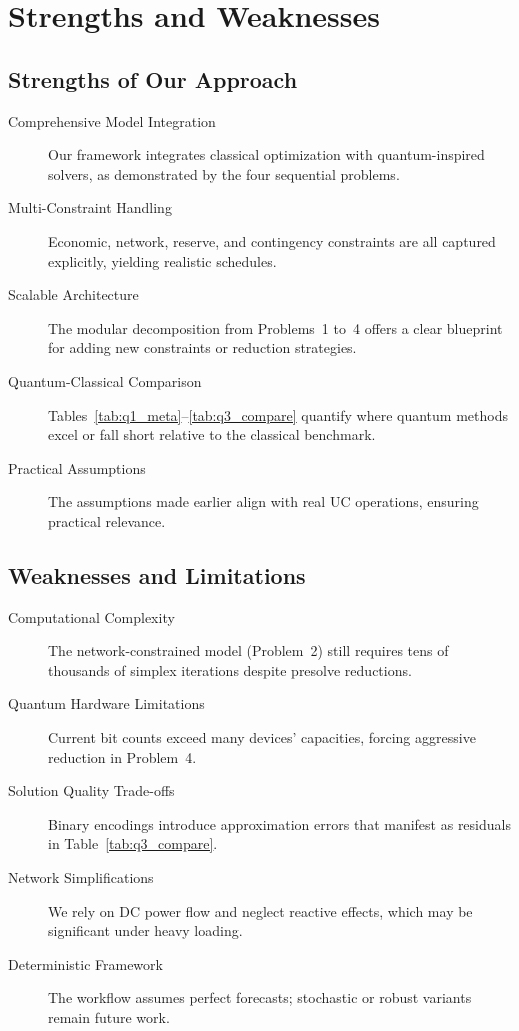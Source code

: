 \documentclass{apmcmthesis}
\begin{document}
\section{Strengths and Weaknesses}

\subsection{Strengths of Our Approach}

\begin{description}
\item[Comprehensive Model Integration] Our framework integrates classical optimization with quantum-inspired solvers, as demonstrated by the four sequential problems.

\item[Multi-Constraint Handling] Economic, network, reserve, and contingency constraints are all captured explicitly, yielding realistic schedules.

\item[Scalable Architecture] The modular decomposition from Problems~1 to~4 offers a clear blueprint for adding new constraints or reduction strategies.

\item[Quantum-Classical Comparison] Tables~\ref{tab:q1_meta}--\ref{tab:q3_compare} quantify where quantum methods excel or fall short relative to the classical benchmark.

\item[Practical Assumptions] The assumptions made earlier align with real UC operations, ensuring practical relevance.
\end{description}

\subsection{Weaknesses and Limitations}

\begin{description}
\item[Computational Complexity] The network-constrained model (Problem~2) still requires tens of thousands of simplex iterations despite presolve reductions.

\item[Quantum Hardware Limitations] Current bit counts exceed many devices' capacities, forcing aggressive reduction in Problem~4.

\item[Solution Quality Trade-offs] Binary encodings introduce approximation errors that manifest as residuals in Table~\ref{tab:q3_compare}.

\item[Network Simplifications] We rely on DC power flow and neglect reactive effects, which may be significant under heavy loading.

\item[Deterministic Framework] The workflow assumes perfect forecasts; stochastic or robust variants remain future work.
\end{description}
\end{document}
